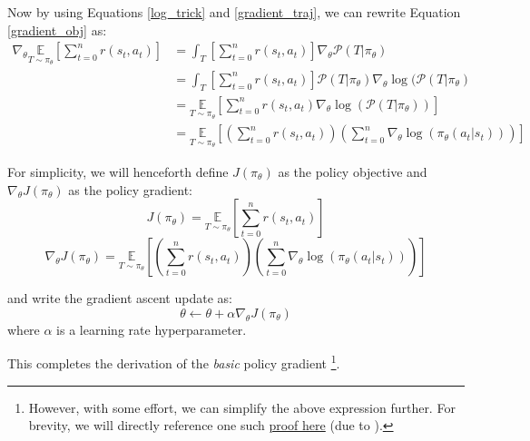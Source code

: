 \documentclass{article} %
\begin{document}
Now by using Equations \eqref{log_trick} and \eqref{gradient_traj}, we can rewrite Equation \eqref{gradient_obj} as:
\begin{equation} \label{gradient_obj_rewritten}
    \begin{aligned}
    \nabla_\theta \underset{T \sim \pi_\theta}{\mathbb{E}} \left[ \sum_{t=0}^{n} r(s_t, a_t) \right] 
        &= \int_{T} \left[\sum_{t=0}^{n} r(s_t, a_t) \right] \nabla_\theta \mathcal{P}(T | \pi_\theta) \\
        &= \int_{T} \left[\sum_{t=0}^{n} r(s_t, a_t) \right] \mathcal{P}(T | \pi_\theta) \nabla_\theta \log(\mathcal{P}(T | \pi_\theta) \\
        &= \underset{T \sim \pi_\theta}{\mathbb{E}} \left[ \sum_{t=0}^{n} r(s_t, a_t) \nabla_\theta \log(\mathcal{P}(T | \pi_\theta)) \right] \\
        &= \underset{T \sim \pi_\theta}{\mathbb{E}} \left[ \left(\sum_{t=0}^{n} r(s_t, a_t)\right) \left( \sum_{t=0}^{n} \nabla_\theta \log(\pi_\theta(a_t | s_t)) \right) \right]
    \end{aligned}
\end{equation}

For simplicity, we will henceforth define $J(\pi_\theta)$ as the policy objective and $\nabla_\theta J(\pi_\theta)$ as the policy gradient:
\begin{equation} \label{policy_objective}
    J(\pi_\theta) = \underset{T \sim \pi_\theta}{\mathbb{E}} \left[ \sum_{t=0}^{n} r(s_t, a_t) \right]
\end{equation}
\begin{equation} \label{policy_gradient}
    \nabla_\theta J(\pi_\theta) = \underset{T \sim \pi_\theta}{\mathbb{E}} \left[ \left(\sum_{t=0}^{n} r(s_t, a_t)\right) \left( \sum_{t=0}^{n} \nabla_\theta \log(\pi_\theta(a_t | s_t)) \right) \right]
\end{equation}

and write the gradient ascent update as:
\begin{equation} \label{policy_gradient_update}
    \theta \leftarrow \theta + \alpha \nabla_\theta J(\pi_\theta)
\end{equation} 
where $\alpha$ is a learning rate hyperparameter.

This completes the derivation of the \textit{basic} policy gradient \footnote{
However, with some effort, we can simplify the above expression further.
For brevity, we will directly reference one such \href{https://spinningup.openai.com/en/latest/spinningup/extra_pg_proof1.html}{proof here} (due to \cite{SpinningUp-2018}).
}.
\end{document}
